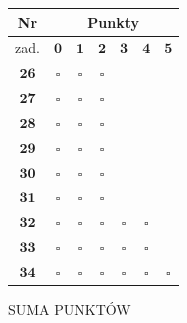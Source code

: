 \documentclass[10pt]{article}
\begin{document}
\begin{center}
\begin{tabular}{|c|c|c|c|c|c|c|}
\hline
Nr & \multicolumn{6}{|c|}{Punkty} \\
\hline
zad. & \(\mathbf{0}\) & \(\mathbf{1}\) & \(\mathbf{2}\) & \(\mathbf{3}\) & \(\mathbf{4}\) & \(\mathbf{5}\) \\
\hline
\(\mathbf{2 6}\) & \(\square\) & \(\square\) & \(\square\) &  &  &  \\
\hline
\(\mathbf{2 7}\) & \(\square\) & \(\square\) & \(\square\) &  &  &  \\
\hline
\(\mathbf{2 8}\) & \(\square\) & \(\square\) & \(\square\) &  &  &  \\
\hline
\(\mathbf{2 9}\) & \(\square\) & \(\square\) & \(\square\) &  &  &  \\
\hline
\(\mathbf{3 0}\) & \(\square\) & \(\square\) & \(\square\) &  &  &  \\
\hline
\(\mathbf{3 1}\) & \(\square\) & \(\square\) & \(\square\) &  &  &  \\
\hline
\(\mathbf{3 2}\) & \(\square\) & \(\square\) & \(\square\) & \(\square\) & \(\square\) &  \\
\hline
\(\mathbf{3 3}\) & \(\square\) & \(\square\) & \(\square\) & \(\square\) & \(\square\) &  \\
\hline
\(\mathbf{3 4}\) & \(\square\) & \(\square\) & \(\square\) & \(\square\) & \(\square\) & \(\square\) \\
\hline
\end{tabular}
\end{center}

SUMA PUNKTÓW
\end{document}
